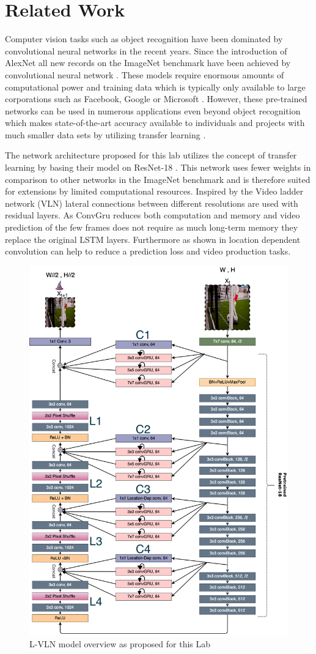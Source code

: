 \documentclass[runningheads,a4paper]{llncs}
\begin{document}
\section{Related Work}
Computer vision tasks such as object recognition have been dominated by convolutional neural networks in the recent years. Since the introduction of AlexNet \citep{krizhevsky_imagenet_2012} all new records on the ImageNet benchmark have been achieved by convolutional neural network \citep{aismartz_cnn_2019}.  These models require enormous amounts of computational power and training data which is typically only available to large corporations such as Facebook, Google or Microsoft \citep{tensorflow_how_2020}. However, these pre-trained networks can be used in numerous applications even beyond object recognition which makes state-of-the-art accuracy available to individuals and projects with much smaller data sets by utilizing transfer learning \citep{tan_survey_2018}.

The network architecture proposed for this lab utilizes the concept of transfer learning by basing their model on ResNet-18 \citep{he_deep_2015}. This network uses fewer weights in comparison to other networks in the ImageNet benchmark and is therefore suited for extensions by limited computational resources. Inspired by the Video ladder network (VLN) \citep{cricri_video_2016} lateral connections between different resolutions are used with residual layers. As ConvGru \citep{siam_convolutional_2016} reduces both computation and memory and video prediction of the few frames does not require as much long-term memory they replace the original LSTM layers. Furthermore as shown in \citep{kurkova_location_2018} location dependent convolution can help to reduce a prediction loss and video production tasks.


\begin{figure}
\includegraphics[width=0.45\linewidth]{res/NimbRoPred}
\caption{ L-VLN model overview as proposed for this Lab}
\label{fig:orig_arch}
\end{figure}
\end{document}
